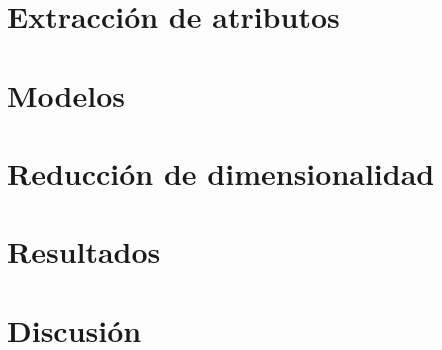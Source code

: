 \documentclass[hidelinks,a4paper,11pt, nofootinbib]{article}
\begin{document}
\maketitle

\section{Extracción de atributos}

\section{Modelos}

\section{Reducción de dimensionalidad}

\section{Resultados}

\section{Discusión}
\end{document}
